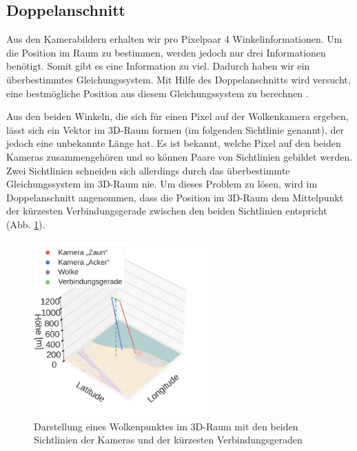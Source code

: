\documentclass[a4paper,11pt,twoside,german]{article}
\newcommand{\absatz}{\smallbreak}
\begin{document}
\subsection{Doppelanschnitt}
\label{SECDoppel}
Aus den Kamerabildern erhalten wir pro Pixelpaar 4 Winkelinformationen. Um die
Position im Raum zu bestimmen, werden jedoch nur drei Informationen benötigt.
Somit gibt es eine Information zu viel. Dadurch haben wir ein überbestimmtes
Gleichungssystem. Mit Hilfe des Doppelanschnitts wird versucht, eine
bestmögliche Position aus diesem Gleichungssystem zu berechnen
\citep{lange_16_praktikum}.

\clearpage
Aus den beiden Winkeln, die sich für einen Pixel auf der Wolkenkamera ergeben,
lässt sich ein Vektor im 3D-Raum formen (im folgenden Sichtlinie genannt), der
jedoch eine unbekannte Länge hat. Es ist bekannt, welche Pixel auf den beiden
Kameras zusammengehören und so können Paare von Sichtlinien gebildet werden.
Zwei Sichtlinien schneiden sich allerdings durch das überbestimmte
Gleichungssystem im 3D-Raum nie. Um dieses Problem zu lösen, wird im
Doppelanschnitt angenommen, dass die Position im 3D-Raum dem Mittelpunkt der
kürzesten Verbindungsgerade zwischen den beiden Sichtlinien entspricht (Abb.
\ref{FIGDoppel3d}).\absatz

\begin{figure}[h]
	\begin{center}
		\includegraphics[width=0.6\textwidth]{media/3d.png}
		\caption[Darstellung des Doppelanschnitts]{Darstellung eines Wolkenpunktes im 3D-Raum mit den beiden Sichtlinien der Kameras und der kürzesten Verbindungsgeraden \footnotemark}
		\label{FIGDoppel3d}
	\end{center}
\end{figure}
\end{document}
